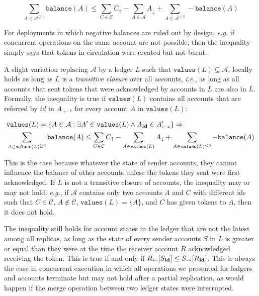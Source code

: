 \documentclass[9pt]{article}   	%
\begin{document}
\begin{equation}
\label{eq:balance-safety}
\sum\limits_{A \in \mathcal{A}^{\geq 0}} \texttt{balance}(A) \leq  
		\sum\limits_{C \in \mathcal{C}} C_\uparrow 
		- \sum\limits_{A \in \mathcal{A}} A_\downarrow 
		+ \sum\limits_{A \in \mathcal{A}^{< 0}}  -\texttt{balance}(A)
\end{equation}

For deployments in which negative balances are ruled out by design, \textit{e.g.} if concurrent operations on the same account are not possible, then the inequality simply says that tokens in circulation were created but not burnt.


A slight variation replacing $\mathcal{A}$ by a ledger $L$ such that $\texttt{values}(L) \subseteq \mathcal{A}$, locally holds as long as $L$ is a \textit{transitive closure} over all accounts, \textit{i.e.},  as long as all accounts that sent tokens that were acknowledged by accounts in $L$ are also in $L$. Formally, the inequality is true if $\texttt{values}(L)$ contains all accounts that are referred by $id$ in $A_{\leftarrow *}$ for every account $A$ in $\texttt{values}(L)$:

\begin{eqnarray*}
\label{eq:balance-safety-ledger}
 & \texttt{values}(L) = \{ A \in \mathcal{A} : \exists A' \in \texttt{values}(L) \wedge A_{\scriptsize \textbf{id}} \in A'_{\leftarrow *} \} 
\Rightarrow \\
& \sum\limits_{A \in \texttt{values}(L)^{\geq 0}} \texttt{balance}(A) \leq  
		\sum\limits_{C \in \mathcal{C}} C_\uparrow 
		- \sum\limits_{A \in \texttt{values}(L)} A_\downarrow 
		+ \sum\limits_{A \in \texttt{values}(L)^{< 0}}  -\texttt{balance}(A)
\end{eqnarray*}

This is the case because whatever the state of sender accounts, they cannot influence the balance of other accounts unless the tokens they sent were first acknowledged. If $L$ is not a transitive closure of accounts, the inequality may or may not hold: \textit{e.g.}, if $\mathcal{A}$ contains only two accounts $A$ and $C$ with different ids such that $C \in \mathcal{C}$, $A \notin \mathcal{C}$, $\texttt{values}(L) = \{ A \}$, and $C$ has given tokens to $A$, then it does not hold.

The inequality still holds for account states in the ledger that are not the latest among all replicas, as long as the state of every sender accounts $S$ in $L$ is greater or equal than they were at the time the receiver account $R$ acknowledged receiving the token. This is true if and only if $R_{\leftarrow}[S_{\scriptsize \textbf{id}}] \leq S_{\rightarrow}[R_{\scriptsize \textbf{id}}]$. This is always the case in concurrent execution in which all operations we presented for ledgers and accounts terminate but may not hold after a partial replication, as would happen if the merge operation between two ledger states were interrupted.
\end{document}
